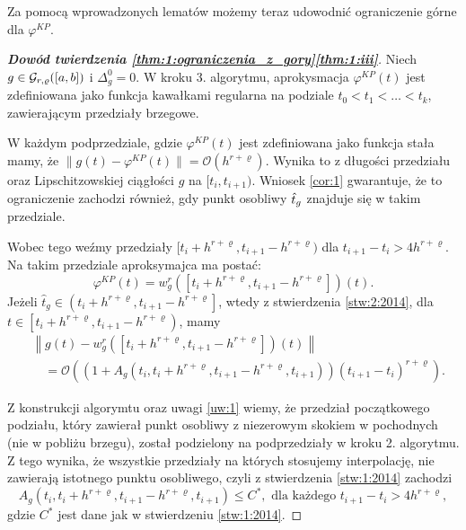 \documentclass[oik, pdftex, robocza, man]{mgrwms}
\begin{document}
    Za pomocą wprowadzonych lematów możemy teraz udowodnić ograniczenie górne dla $\varphi^{KP}$.

    \begin{proof}[\textbf{Dowód twierdzenia \ref{thm:1:ograniczenia_z_gory}\ref{thm:1:iii}}]
        Niech $g \in \mathcal{G}_{r,\varrho}([a,b])$ i $\Delta_{g}^{0} = 0$. W kroku 3. algorytmu, aprokysmacja $\varphi^{KP}(t)$ jest zdefiniowana jako funkcja kawałkami regularna na podziale $t_{0} < t_{1} < \ldots < t_{k}$, zawierającym przedziały brzegowe.
        
        W każdym podprzedziale, gdzie $\varphi^{KP}(t)$ jest zdefiniowana jako funkcja stała mamy, że $\|g(t) - \varphi^{KP}(t)\| = \mathcal{O}(h^{r+\varrho})$. Wynika to z długości przedziału oraz Lipschitzowskiej ciągłości $g$ na $[t_{i}, t_{i+1})$. Wniosek \ref{cor:1} gwarantuje, że to ograniczenie zachodzi również, gdy punkt osobliwy $\hat{t}_{g}$ znajduje się w takim przedziale.

        Wobec tego weźmy przedziały $[t_{i} + h^{r+\varrho}, t_{i+1} - h^{r+\varrho})$ dla $t_{i+1}-t_{i} > 4h^{r+\varrho}$. Na takim przedziale aproksymajca ma postać:
        \begin{equation*}
            \varphi^{KP}(t)=w_{g}^{r}\left(\left[t_{i}+h^{r+\varrho}, t_{i+1}-h^{r+\varrho}\right]\right)(t).
        \end{equation*}
        Jeżeli $\hat{t}_{g} \in\left(t_{i}+h^{r+\varrho}, t_{i+1}-h^{r+\varrho}\right]$, wtedy z stwierdzenia \ref{stw:2:2014}, dla $t \in\left[t_{i}+h^{r+\varrho}, t_{i+1}-h^{r+\varrho}\right)$, mamy
        \begin{equation*}
            \begin{aligned}
                &\left\|g(t)-w_{g}^{r}\left(\left[t_{i}+h^{r+\varrho}, t_{i+1}-h^{r+\varrho}\right]\right)(t)\right\| \\
                &\quad=\mathcal{O}\left(\left(1+A_{g}\left(t_{i}, t_{i}+h^{r+\varrho}, t_{i+1}-h^{r+\varrho}, t_{i+1}\right)\right)\left(t_{i+1}-t_{i}\right)^{r+\varrho}\right).
            \end{aligned}                            
        \end{equation*}

        Z konstrukcji algorymtu oraz uwagi \ref{uw:1} wiemy, że przedział początkowego podziału, który zawierał punkt osobliwy z niezerowym skokiem w pochodnych (nie w pobliżu brzegu), został podzielony na podprzedziały w kroku 2. algorytmu. Z tego wynika, że wszystkie przedziały na których stosujemy interpolację, nie zawierają istotnego punktu osobliwego, czyli z stwierdzenia \ref{stw:1:2014} zachodzi
        \begin{equation*}
            A_{g}\left(t_{i}, t_{i}+h^{r+\varrho}, t_{i+1}-h^{r+\varrho}, t_{i+1}\right) \leq C^{*}, \text{ dla każdego } t_{i+1} - t_{i} > 4h^{r+\varrho},
        \end{equation*}
        gdzie $C^{*}$ jest dane jak w stwierdzeniu \ref{stw:1:2014}.


\end{proof}
\end{document}
